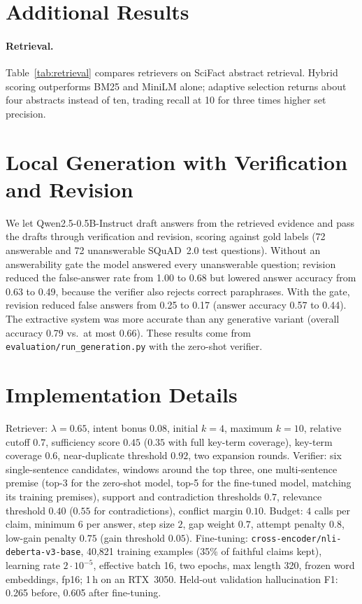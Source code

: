 \section{Additional Results}
\label{app:results}





\paragraph{Retrieval.}
Table~\ref{tab:retrieval} compares retrievers on SciFact abstract retrieval. Hybrid scoring outperforms BM25 and MiniLM alone; adaptive selection returns about four abstracts instead of ten, trading recall at 10 for three times higher set precision.

\section{Local Generation with Verification and Revision}
\label{app:generation}
We let Qwen2.5-0.5B-Instruct \citep{qwen2024qwen25} draft answers from the retrieved evidence and pass the drafts through verification and revision, scoring against gold labels (72 answerable and 72 unanswerable SQuAD~2.0 test questions).
Without an answerability gate the model answered every unanswerable question; revision reduced the false-answer rate from 1.00 to 0.68 but lowered answer accuracy from 0.63 to 0.49, because the verifier also rejects correct paraphrases.
With the gate, revision reduced false answers from 0.25 to 0.17 (answer accuracy 0.57 to 0.44).
The extractive system was more accurate than any generative variant (overall accuracy 0.79 vs.\ at most 0.66).
These results come from \texttt{evaluation/run\_generation.py} with the zero-shot verifier.

\section{Implementation Details}
\label{app:implementation}
Retriever: $\lambda{=}0.65$, intent bonus $0.08$, initial $k{=}4$, maximum $k{=}10$, relative cutoff $0.7$, sufficiency score $0.45$ ($0.35$ with full key-term coverage), key-term coverage $0.6$, near-duplicate threshold $0.92$, two expansion rounds.
Verifier: six single-sentence candidates, windows around the top three, one multi-sentence premise (top-3 for the zero-shot model, top-5 for the fine-tuned model, matching its training premises), support and contradiction thresholds $0.7$, relevance threshold $0.40$ ($0.55$ for contradictions), conflict margin $0.10$.
Budget: $4$ calls per claim, minimum $6$ per answer, step size $2$, gap weight $0.7$, attempt penalty $0.8$, low-gain penalty $0.75$ (gain threshold $0.05$).
Fine-tuning: \texttt{cross-encoder/nli-deberta-v3-base}, 40{,}821 training examples (35\% of faithful claims kept), learning rate $2{\cdot}10^{-5}$, effective batch 16, two epochs, max length 320, frozen word embeddings, fp16; 1\,h on an RTX~3050. Held-out validation hallucination F1: 0.265 before, 0.605 after fine-tuning.
